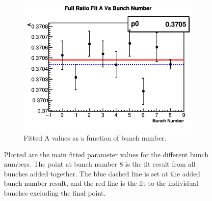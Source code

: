 \begin{figure}[]
			\vspace{4mm}
		    \begin{subfigure}[t]{0.4\textwidth}
			    \centering
				\includegraphics[width=\textwidth]{RatioCBO_A_Vs_BunchNum_Canv}
			    \caption{Fitted A values as a function of bunch number.}
		    \end{subfigure}
		\caption[BunchNumPars]{Plotted are the main fitted parameter values for the different bunch numbers. The point at bunch number 8 is the fit result from all bunches added together. The blue dashed line is set at the added bunch number result, and the red line is the fit to the individual bunches excluding the final point.}
		\label{fig:BunchNumPars}
		\end{figure}

